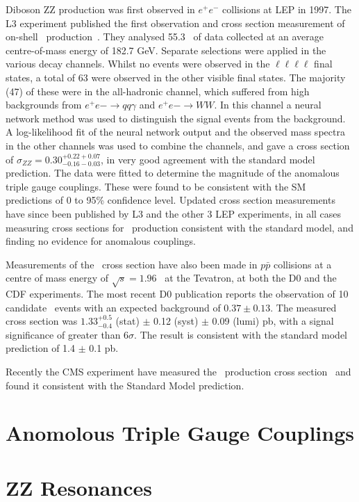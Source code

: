 Diboson ZZ production was first observed in $e^+e^-$ collisions at LEP in 1997.
The L3 experiment published the first observation and cross section measurement
of on-shell \ZZ\ production~\cite{Acciarri1999281}. They analysed 55.3 \ipb\
of data collected at an average centre-of-mass energy of 182.7 GeV. Separate
selections were applied in the various decay channels. Whilst no events were
observed in the $\ell\ell\ell\ell$ final states, a total of 63 were observed in
the other visible final states. The majority (47) of these were in the
all-hadronic channel, which suffered from high backgrounds from $e^+e-
\rightarrow qq \gamma$ and $e^+e- \rightarrow WW$. In this channel a neural
network method was used to distinguish the signal events from the background. A
log-likelihood fit of the neural network output and the observed mass spectra in
the other channels was used to combine the channels, and gave a cross section of
$\sigma_{ZZ} = 0.30^{+0.22 +0.07}_{-0.16 -0.03}$, in very good agreement with
the standard model prediction. The data were fitted to determine the magnitude
of the anomalous triple gauge couplings. These were found to be consistent with
the SM predictions of 0 to 95\% confidence level. Updated cross section
measurements have since been published by L3 and the other 3 LEP experiments, in
all cases measuring cross sections for \ZZ\ production consistent with the
standard model, and finding no evidence for anomalous couplings.

Measurements of the \ZZ\ cross section have also been made in $p \bar{p}$
collisions at a centre of mass energy of $\sqrt{s} = 1.96$ \tev\ at the Tevatron, at
both the D0 and the CDF experiments. The most recent D0 publication reports the
observation of 10 candidate \ZZ\ events with an expected background of $0.37
\pm 0.13$. The measured cross section was $1.33^{+0.5}_{-0.4}$ (stat) $\pm$ 0.12
(syst) $\pm$ 0.09 (lumi) pb, with a signal significance of greater than
$6\sigma$. The result is consistent with the standard model prediction of 1.4
$\pm$ 0.1 pb. 

Recently the CMS experiment have measured the \ZZ\ production cross
section~\cite{CMS-PAS-EWK-11-010} and found it consistent with the Standard Model prediction.


\section{Anomolous Triple Gauge Couplings}

\section{ZZ Resonances}
